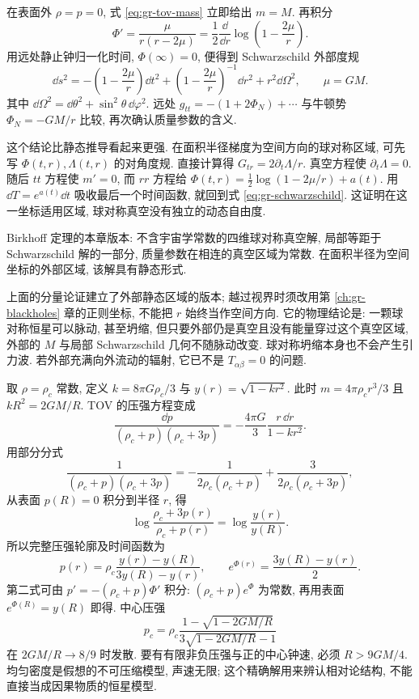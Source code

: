 
在表面外 $\rho=p=0$, 式 \eqref{eq:gr-tov-mass} 立即给出 $m=M$. 再积分
\[
 \Phi'=\frac{\mu}{r(r-2\mu)}
       =\frac12\frac{\dd}{\dd r}\log\left(1-\frac{2\mu}r\right).
\]
用远处静止钟归一化时间, $\Phi(\infty)=0$, 便得到 Schwarzschild 外部度规
\begin{equation}
 \dd s^2=-\left(1-\frac{2\mu}r\right)\dd t^2
        +\left(1-\frac{2\mu}r\right)^{-1}\dd r^2+r^2\dd\Omega^2,
 \qquad \mu=GM.
 \label{eq:gr-schwarzschild}
\end{equation}
其中 $\dd\Omega^2=\dd\theta^2+\sin^2\theta\,\dd\varphi^2$. 远处 $g_{tt}=-(1+2\Phi_N)+\cdots$ 与牛顿势 $\Phi_N=-GM/r$ 比较, 再次确认质量参数的含义.

这个结论比静态推导看起来更强. 在面积半径梯度为空间方向的球对称区域, 可先写 $\Phi(t,r),\Lambda(t,r)$ 的对角度规. 直接计算得 $G_{tr}=2\partial_t\Lambda/r$. 真空方程使 $\partial_t\Lambda=0$. 随后 $tt$ 方程使 $m'=0$, 而 $rr$ 方程给 $\Phi(t,r)=\tfrac12\log(1-2\mu/r)+a(t)$. 用 $\dd T=e^{a(t)}\dd t$ 吸收最后一个时间函数, 就回到式 \eqref{eq:gr-schwarzschild}. 这证明在这一坐标适用区域, 球对称真空没有独立的动态自由度.

\begin{theorem}
 Birkhoff 定理的本章版本: 不含宇宙学常数的四维球对称真空解, 局部等距于 Schwarzschild 解的一部分, 质量参数在相连的真空区域为常数. 在面积半径为空间坐标的外部区域, 该解具有静态形式.
\end{theorem}

上面的分量论证建立了外部静态区域的版本; 越过视界时须改用第 \ref{ch:gr-blackholes} 章的正则坐标, 不能把 $r$ 始终当作空间方向. 它的物理结论是: 一颗球对称恒星可以脉动, 甚至坍缩, 但只要外部仍是真空且没有能量穿过这个真空区域, 外部的 $M$ 与局部 Schwarzschild 几何不随脉动改变. 球对称坍缩本身也不会产生引力波. 若外部充满向外流动的辐射, 它已不是 $T_{\alpha\beta}=0$ 的问题.


取 $\rho=\rho_c$ 常数, 定义 $k=8\pi G\rho_c/3$ 与 $y(r)=\sqrt{1-kr^2}$. 此时 $m=4\pi\rho_c r^3/3$ 且 $kR^2=2GM/R$. TOV 的压强方程变成
\[
 \frac{\dd p}{(\rho_c+p)(\rho_c+3p)}
       =-\frac{4\pi G}3\frac{r\,\dd r}{1-kr^2}.
\]
用部分分式
\[
 \frac1{(\rho_c+p)(\rho_c+3p)}
   =-\frac1{2\rho_c(\rho_c+p)}
      +\frac3{2\rho_c(\rho_c+3p)},
\]
从表面 $p(R)=0$ 积分到半径 $r$, 得
\[
 \log\frac{\rho_c+3p(r)}{\rho_c+p(r)}
   =\log\frac{y(r)}{y(R)}.
\]
所以完整压强轮廓及时间函数为
\begin{equation}
 p(r)=\rho_c\frac{y(r)-y(R)}{3y(R)-y(r)},\qquad
 e^{\Phi(r)}=\frac{3y(R)-y(r)}2.
 \label{eq:gr-uniform-star}
\end{equation}
第二式可由 $p'=-(\rho_c+p)\Phi'$ 积分: $(\rho_c+p)e^\Phi$ 为常数, 再用表面 $e^{\Phi(R)}=y(R)$ 即得. 中心压强
\begin{equation}
 p_c=\rho_c\frac{1-\sqrt{1-2GM/R}}{3\sqrt{1-2GM/R}-1}
 \label{eq:gr-central-pressure}
\end{equation}
在 $2GM/R\to8/9$ 时发散. 要有有限非负压强与正的中心钟速, 必须 $R>9GM/4$. 均匀密度是假想的不可压缩模型, 声速无限; 这个精确解用来辨认相对论结构, 不能直接当成因果物质的恒星模型.

